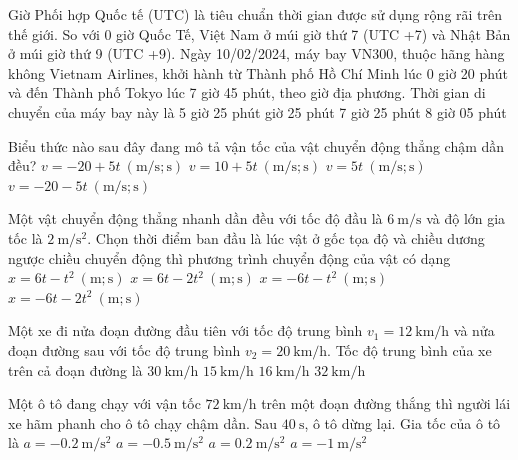 \begin{ex}
	Giờ Phối hợp Quốc tế (UTC) là tiêu chuẩn thời gian được sử dụng rộng rãi trên thế giới. So với 0 giờ Quốc Tế, Việt Nam ở múi giờ thứ 7 (UTC +7) và Nhật Bản ở múi giờ thứ 9 (UTC +9). Ngày 10/02/2024, máy bay VN300, thuộc hãng hàng không Vietnam Airlines, khởi hành từ Thành phố Hồ Chí Minh lúc 0 giờ 20 phút và đến Thành phố Tokyo lúc 7 giờ 45 phút, theo giờ địa phương. Thời gian di chuyển của máy bay này là
	\choice
	{5 giờ 25 phút}
	{ giờ 25 phút}
	{7 giờ 25 phút}
	{8 giờ 05 phút}
	\loigiai{
	}
\end{ex}

\begin{ex}
	Biểu thức nào sau đây đang mô tả vận tốc của vật chuyển động thẳng chậm dần đều?
	\choice
	{\True $v=-20+5t\ \left(\si{\meter/\second}; \si{\second}\right)$}
	{$v=10+5t\ \left(\si{\meter/\second}; \si{\second}\right)$}
	{$v=5t\ \left(\si{\meter/\second}; \si{\second}\right)$}
	{$v=-20-5t\ \left(\si{\meter/\second}; \si{\second}\right)$}
	\loigiai{}
\end{ex}
\begin{ex}
	Một vật chuyển động thẳng nhanh dần đều với tốc độ đầu là $\SI{6}{\meter/\second}$ và độ lớn gia tốc là $\SI{2}{\meter/\second^2}$. Chọn thời điểm ban đầu là lúc vật ở gốc tọa độ và chiều dương ngược chiều chuyển động thì phương trình chuyển động của vật có dạng
	\choice
	{$x=6t-t^2\ \left(\si{\meter}; \si{\second}\right)$}
	{$x=6t-2t^2\ \left(\si{\meter}; \si{\second}\right)$}
	{\True $x=-6t-t^2\ \left(\si{\meter}; \si{\second}\right)$}
	{$x=-6t-2t^2\ \left(\si{\meter}; \si{\second}\right)$}
	\loigiai{}
\end{ex}
\begin{ex}
	Một xe đi nửa đoạn đường đầu tiên với tốc độ trung bình
	 $v_1=\SI{12}{\kilo\meter/\hour}$ và nửa đoạn đường	sau với tốc độ trung bình $v_2=\SI{20}{\kilo\meter/\hour}$. Tốc độ trung bình của xe trên cả đoạn đường là
	\choice
	{$\SI{30}{\kilo\meter/\hour}$}
	{\True $\SI{15}{\kilo\meter/\hour}$}
	{$\SI{16}{\kilo\meter/\hour}$}
	{$\SI{32}{\kilo\meter/\hour}$}
\end{ex}
\begin{ex}
	Một ô tô đang chạy với vận tốc $\SI{72}{\kilo\meter/\hour}$ trên một đoạn đường thắng thì người lái xe hãm phanh cho ô tô chạy chậm dần. Sau $\SI{40}{\second}$, ô tô dừng lại. Gia tốc của ô tô là
	\choice
	{$a=\SI{-0.2}{\meter/\second^2}$}
	{\True $a=\SI{-0.5}{\meter/\second^2}$}
	{$a=\SI{0.2}{\meter/\second^2}$}
	{$a=\SI{-1}{\meter/\second^2}$}
\end{ex}

